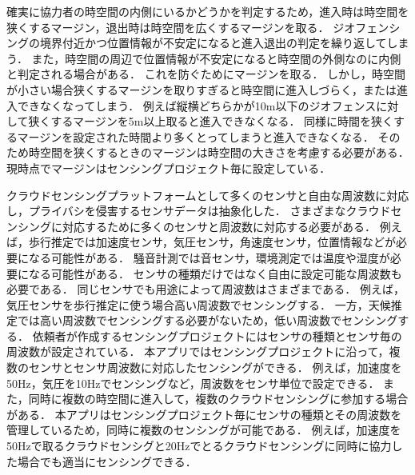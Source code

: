 確実に協力者の時空間の内側にいるかどうかを判定するため，進入時は時空間を狭くするマージン，退出時は時空間を広くするマージンを取る．
ジオフェンシングの境界付近かつ位置情報が不安定になると進入退出の判定を繰り返してしまう．
また，時空間の周辺で位置情報が不安定になると時空間の外側なのに内側と判定される場合がある．
これを防ぐためにマージンを取る．
しかし，時空間が小さい場合狭くするマージンを取りすぎると時空間に進入しづらく，または進入できなくなってしまう．
例えば縦横どちらかが10m以下のジオフェンスに対して狭くするマージンを5m以上取ると進入できなくなる．
同様に時間を狭くするマージンを設定された時間より多くとってしまうと進入できなくなる．
そのため時空間を狭くするときのマージンは時空間の大きさを考慮する必要がある．
現時点でマージンはセンシングプロジェクト毎に設定している．

クラウドセンシングプラットフォームとして多くのセンサと自由な周波数に対応し，プライバシを侵害するセンサデータは抽象化した．
さまざまなクラウドセンシングに対応するために多くのセンサと周波数に対応する必要がある．
例えば，歩行推定では加速度センサ，気圧センサ，角速度センサ，位置情報などが必要になる可能性がある．
騒音計測では音センサ，環境測定では温度や湿度が必要になる可能性がある．
センサの種類だけではなく自由に設定可能な周波数も必要である．
同じセンサでも用途によって周波数はさまざまである．
例えば，気圧センサを歩行推定に使う場合高い周波数でセンシングする．
一方，天候推定では高い周波数でセンシングする必要がないため，低い周波数でセンシングする．
依頼者が作成するセンシングプロジェクトにはセンサの種類とセンサ毎の周波数が設定されている．
本アプリではセンシングプロジェクトに沿って，複数のセンサとセンサ周波数に対応したセンシングができる．
例えば，加速度を50Hz，気圧を10Hzでセンシングなど，周波数をセンサ単位で設定できる．
また，同時に複数の時空間に進入して，複数のクラウドセンシングに参加する場合がある．
本アプリはセンシングプロジェクト毎にセンサの種類とその周波数を管理しているため，同時に複数のセンシングが可能である．
例えば，加速度を50Hzで取るクラウドセンシグと20Hzでとるクラウドセンシングに同時に協力した場合でも適当にセンシングできる．


